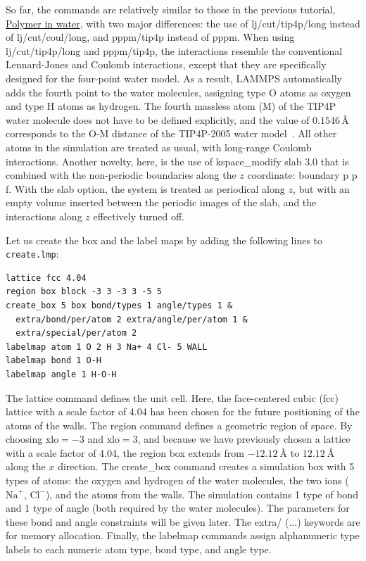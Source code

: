 \documentclass[9pt,tutorial]{livecoms}
\newcommand{\lmpcmd}[1]{\hspace{0pt}\colorbox{listing}{\textcolor{command}{\small{#1}}}\hspace{0pt}} %
\newcommand{\flecmd}[1]{\textcolor{command}{\texttt{#1}}} %
\begin{document}
So far, the commands are relatively similar to those in the previous tutorial,
\hyperref[all-atom-label]{Polymer in water}, with two major differences: the use
of \lmpcmd{lj/cut/tip4p/long} instead of \lmpcmd{lj/cut/coul/long}, and \lmpcmd{pppm/tip4p}
instead of \lmpcmd{pppm}.  When using \lmpcmd{lj/cut/tip4p/long} and \lmpcmd{pppm/tip4p},
the interactions resemble the conventional Lennard-Jones and Coulomb interactions,
except that they are specifically designed for the four-point water model.  As a result,
LAMMPS automatically {\color{blue}adds the fourth point to the water molecules}, assigning type O
atoms as oxygen and type H atoms as hydrogen.  The fourth massless atom (M) of the
TIP4P water molecule does not have to be defined explicitly, and the value of
$0.1546\,\text{\AA{}}$ corresponds to the O-M distance of the
TIP4P-2005 water model~\cite{abascal2005general}.  All other atoms in the simulation
are treated as usual, with long-range Coulomb interactions.  Another novelty, here, is
the use of \lmpcmd{kspace\_modify slab 3.0} that is combined with the non-periodic
boundaries along the $z$ coordinate: \lmpcmd{boundary p p f}.  With the \lmpcmd{slab}
option, the system is treated as periodical along $z$, but with an empty volume inserted
between the periodic images of the slab, and the interactions along $z$ effectively turned off.

Let us create the box and the label maps by adding the following lines to \flecmd{create.lmp}:
\begin{lstlisting}
lattice fcc 4.04
region box block -3 3 -3 3 -5 5
create_box 5 box bond/types 1 angle/types 1 &
  extra/bond/per/atom 2 extra/angle/per/atom 1 &
  extra/special/per/atom 2
labelmap atom 1 O 2 H 3 Na+ 4 Cl- 5 WALL
labelmap bond 1 O-H
labelmap angle 1 H-O-H
\end{lstlisting}
The \lmpcmd{lattice} command defines the unit cell.  Here, the face-centered cubic (fcc) lattice
with a scale factor of 4.04 has been chosen for the future positioning of the atoms
of the walls.  The \lmpcmd{region} command defines a geometric region of space.  By choosing
$\text{xlo}=-3$ and $\text{xlo}=3$, and because we have previously chosen a lattice with a scale
factor of 4.04, the region box extends from $-12.12~\text{\AA{}}$ to $12.12~\text{\AA{}}$
along the $x$ direction.  The \lmpcmd{create\_box} command creates a simulation box with
5 types of atoms: the oxygen and hydrogen of the water molecules, the two ions ($\text{Na}^+$,
$\text{Cl}^-$), and the atoms from the walls.  The simulation contains 1 type of bond
and 1 type of angle (both required by the water molecules).
The parameters for these bond and angle constraints will be given later.  The \lmpcmd{extra/ (...)}
keywords are for memory allocation.  Finally, the \lmpcmd{labelmap} commands assign
alphanumeric type labels to each numeric atom type, bond type, and angle type.
\end{document}
